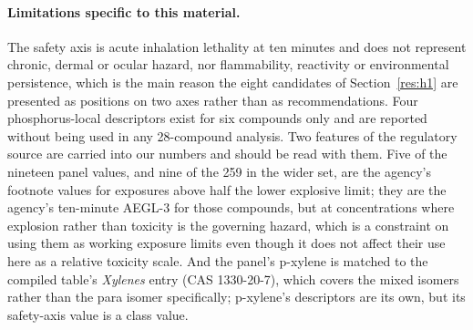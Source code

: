 \documentclass[journal=jacsat,manuscript=suppinfo,margin=1in]{achemso}
\begin{document}
\paragraph{Limitations specific to this material.} The safety axis is acute inhalation lethality at
ten minutes and does not represent chronic, dermal or ocular hazard, nor
flammability, reactivity or environmental persistence, which is the main reason
the eight candidates of Section~\ref{res:h1} are presented as positions on two
axes rather than as recommendations. Four phosphorus-local descriptors exist for
six compounds only and are reported without being used in any 28-compound
analysis. Two features of the regulatory source are carried into our numbers and
should be read with them. Five of the nineteen panel values, and nine of the 259
in the wider set, are the agency's footnote values for exposures above half the
lower explosive limit; they are the agency's ten-minute AEGL-3 for those
compounds, but at concentrations where explosion rather than toxicity is the
governing hazard, which is a constraint on using them as working exposure
limits even though it does not affect their use here as a relative toxicity
scale. And the panel's p-xylene is matched to the compiled table's
\textit{Xylenes} entry (CAS 1330-20-7), which covers the mixed isomers rather
than the para isomer specifically; p-xylene's descriptors are its own, but its
safety-axis value is a class value.


\end{document}

